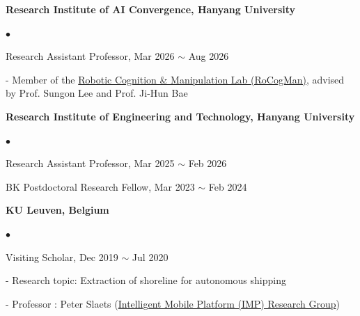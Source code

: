 \documentclass[margin,line]{res}
\newenvironment{list1}{
  \begin{list}{\ding{113}}{%
      \setlength{\itemsep}{0.1in}
      \setlength{\parsep}{0in} \setlength{\parskip}{0in}
      \setlength{\topsep}{0in} \setlength{\partopsep}{0in} 
      \setlength{\leftmargin}{0.17in}}}
      {\end{list}}
\newenvironment{list2}{
  \begin{list}{$\bullet$}{%
      \setlength{\itemsep}{0.05in}
      \setlength{\parsep}{0in} \setlength{\parskip}{0in}
      \setlength{\topsep}{0in} \setlength{\partopsep}{0in} 
      \setlength{\leftmargin}{0.2in}}}{\end{list}}
\begin{document}
\begin{resume}
{\bf Research Institute of AI Convergence, Hanyang University}\\
\vspace*{-.1in}
\begin{list2}
\item Research Assistant Professor, Mar 2026 $\sim$ Aug 2026
\begin{list1}
\vspace*{.04in}
\item[] - Member of the \href{https://bmr.hanyang.ac.kr}{Robotic Cognition \& Manipulation Lab (RoCogMan)}, advised by Prof. Sungon Lee and Prof. Ji-Hun Bae
\end{list1}
\end{list2}

{\bf Research Institute of Engineering and Technology, Hanyang University}\\
\vspace*{-.1in}
\begin{list2}
\item Research Assistant Professor, Mar 2025 $\sim$ Feb 2026
\item BK Postdoctoral Research Fellow, Mar 2023 $\sim$ Feb 2024
\end{list2}

{\bf KU Leuven, Belgium}\\
\vspace*{-.1in}
\begin{list2}
\item Visiting Scholar, Dec 2019 $\sim$ Jul 2020
\begin{list1}
\vspace*{.04in}
\item[] - Research topic: Extraction of shoreline for autonomous shipping
\item[] - Professor : Peter Slaets (\href{https://www.mech.kuleuven.be/imp/}{Intelligent Mobile Platform (IMP) Research Group})
\end{list1}
\end{list2}


\end{resume}
\end{document}

